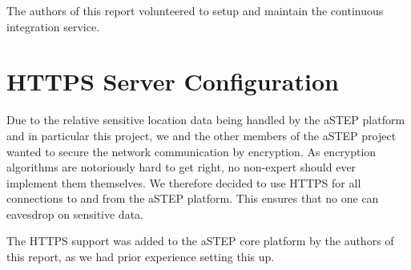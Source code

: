 The authors of this report volunteered to setup and maintain the continuous integration service.

\section{HTTPS Server Configuration}
Due to the relative sensitive location data being handled by the aSTEP platform and in particular this project, we and the other members of the aSTEP project wanted to secure the network communication by encryption. As encryption algorithms are notoriously hard to get right, no non-expert should ever implement them themselves. We therefore decided to use HTTPS for all connections to and from the aSTEP platform. This ensures that no one can eavesdrop on sensitive data.

The HTTPS support was added to the aSTEP core platform by the authors of this report, as we had prior experience setting this up.










